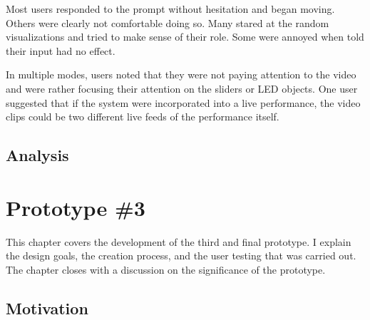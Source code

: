 Most users responded to the prompt without hesitation and began moving. Others were clearly not comfortable doing so. Many stared at the random visualizations and tried to make sense of their role. Some were annoyed when told their input had no effect.

In multiple modes, users noted that they were not paying attention to the video and were rather focusing their attention on the sliders or LED objects. One user suggested that if the system were incorporated into a live performance, the video clips could be two different live feeds of the performance itself.

\subsection{Analysis}











\section{Prototype \#3}

This chapter covers the development of the third and final prototype. I explain the design goals, the creation process, and the user testing that was carried out. The chapter closes with a discussion on the significance of the prototype.

\subsection{Motivation}

